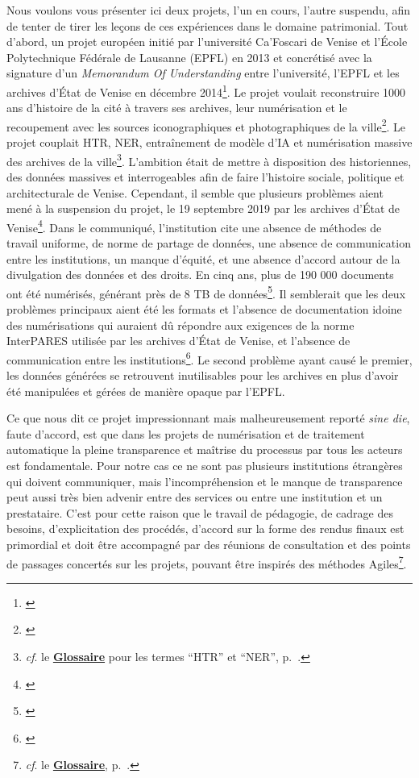Nous voulons vous présenter ici deux projets, l'un en cours, l'autre suspendu, afin de tenter de tirer les leçons de ces expériences dans le domaine patrimonial. Tout d'abord, un projet européen initié par l'université Ca'Foscari de Venise et l'École Polytechnique Fédérale de Lausanne (EPFL) en 2013 et concrétisé avec la signature d'un \textit{Memorandum Of Understanding} entre l'université, l'EPFL et les archives d'État de Venise en décembre 2014\footnote{\cite{castelvecchi_venice_2019}}. Le projet voulait reconstruire 1000 ans d'histoire de la cité à travers ses archives, leur numérisation et le recoupement avec les sources iconographiques et photographiques de la ville\footnote{\cite{epfl_presentation_2017}}. Le projet couplait HTR, NER, entraînement de modèle d'IA et numérisation massive des archives de la ville\footnote{\textit{cf}. le \textbf{\hyperref[sec:Glossaire]{Glossaire}} pour les termes \enquote{HTR} et \enquote{NER}, p.~\pageref{sec:Glossaire}.}. L'ambition était de mettre à disposition des historien\wokisme nes, des données massives et interrogeables afin de faire l'histoire sociale, politique et architecturale de Venise. Cependant, il semble que plusieurs problèmes aient mené à la suspension du projet, le 19 septembre 2019 par les archives d'État de Venise\footnote{\cite{noauthor_sospensione_nodate}}. Dans le communiqué, l'institution cite une absence de méthodes de travail uniforme, de norme de partage de données, une absence de communication entre les institutions, un manque d'équité, et une absence d'accord autour de la divulgation des données et des droits. En cinq ans, plus de 190 000 documents ont été numérisés, générant près de 8 TB de données\footnote{\cite{burns_venice_2019}}. Il semblerait que les deux problèmes principaux aient été les formats et l'absence de documentation idoine des numérisations qui auraient dû répondre aux exigences de la norme InterPARES utilisée par les archives d'État de Venise, et l'absence de communication entre les institutions\footnote{\cite{castelvecchi_venice_2019}}. Le second problème ayant causé le premier, les données générées se retrouvent inutilisables pour les archives en plus d'avoir été manipulées et gérées de manière opaque par l'EPFL. 

Ce que nous dit ce projet impressionnant mais malheureusement reporté \textit{sine die}, faute d'accord, est que dans les projets de numérisation et de traitement automatique la pleine transparence et maîtrise du processus par tous les acteurs est fondamentale. Pour notre cas ce ne sont pas plusieurs institutions étrangères qui doivent communiquer, mais l'incompréhension et le manque de transparence peut aussi très bien advenir entre des services ou entre une institution et un prestataire. C'est pour cette raison que le travail de pédagogie, de cadrage des besoins, d'explicitation des procédés, d'accord sur la forme des rendus finaux est primordial et doit être accompagné par des réunions de consultation et des points de passages concertés sur les projets, pouvant être inspirés des méthodes Agiles\footnote{\textit{cf}. le \textbf{\hyperref[sec:Glossaire]{Glossaire}}, p.~\pageref{sec:Glossaire}.}. 

